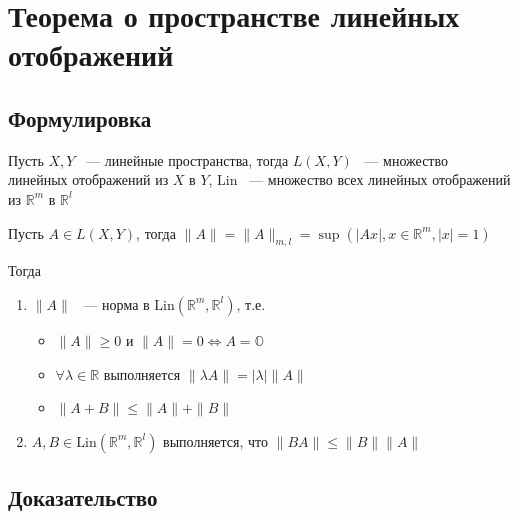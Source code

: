 \documentclass{article}
\begin{document}
    \newpage
    
    \section{Теорема о пространстве линейных отображений}
    
        \subsection{Формулировка}
        
            Пусть $X, Y$ ~--- линейные пространства, тогда $L(X, Y)$ ~--- множество линейных отображений из $X$ в $Y$, $\mathrm{Lin}$ ~--- множество всех линейных отображений из $\mathbb{R}^m$ в $\mathbb{R}^l$
            
            Пусть $A \in L(X, Y)$, тогда $\| A \| = \| A \|_{m, l} = \sup \left( |Ax|, x \in \mathbb{R}^m, |x| = 1 \right)$
            
            Тогда
            
            \begin{enumerate}
            
                \item $\| A \|$ ~--- норма в $\mathrm{Lin} (\mathbb{R}^m, \mathbb{R}^l)$, т.е.
                
                    \begin{itemize}
                
                        \item $\| A \| \geq 0$ и $\| A \| = 0 \Longleftrightarrow A = \mathbb{O}$
                        
                        \item $\forall \lambda \in \mathbb{R}$ выполняется $\| \lambda A \| = | \lambda | \| A \|$
                        
                        \item $\| A + B \| \leq \| A \| + \| B \|$
                        
                    \end{itemize}
                
                \item $A, B \in \mathrm{Lin}(\mathbb{R}^m, \mathbb{R}^l)$ выполняется, что $\| BA \| \leq \| B \| \| A \|$
                
            \end{enumerate}
            
        \subsection{Доказательство}
        
\end{document}
